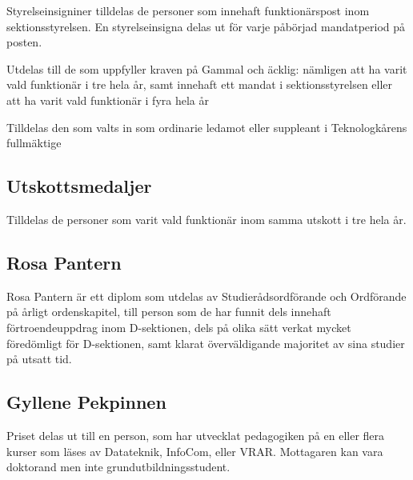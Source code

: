 \documentclass[pdfbookmarks,a4paper,11pt]{article}
\newlength{\itemcollength}
\newenvironment{reglemlista}{%
  \begin{list}{}{%
      \setlength{\labelwidth}{\itemcollength}%
      \setlength{\leftmargin}{\labelwidth + \labelsep}%
      \renewcommand{\makelabel}[1]{%
        \raisebox{0pt}[1ex][0pt]{%
          \makebox[\labelwidth][l]{%
            \parbox[t]{\itemcollength}{%
              \raggedright\hspace{0pt}##1}}}\hfill}%
      }}{%
  \end{list}}
\begin{document}
\begin{reglemlista}
	\item[Styrelseinsigniner]
	Styrelseinsigniner tilldelas de personer som innehaft funktionärspost inom sektionsstyrelsen. En styrelseinsigna delas ut för varje påbörjad mandatperiod på posten.
	\item[Gammal och äcklig]
	Utdelas till de som uppfyller kraven på Gammal och äcklig: nämligen att ha varit vald funktionär i tre hela år, samt innehaft ett mandat i sektionsstyrelsen eller att ha varit vald funktionär i fyra hela år
	\item[TLTH-Fullmäktige]
	Tilldelas den som valts in som ordinarie ledamot eller suppleant i Teknologkårens fullmäktige

\end{reglemlista}
\subsection{Utskottsmedaljer}
    
    Tilldelas de personer som varit vald funktionär inom samma utskott i tre hela år.  

\subsection{Rosa Pantern}
Rosa Pantern är ett diplom som utdelas av Studierådsordförande och Ordförande på årligt ordenskapitel, till person som de har funnit dels innehaft förtroendeuppdrag inom D-sektionen, dels på olika sätt verkat mycket föredömligt för D-sektionen, samt klarat överväldigande majoritet av sina studier på utsatt tid.

\subsection{Gyllene Pekpinnen}
Priset delas ut till en person, som har utvecklat pedagogiken på en eller flera kurser som läses av Datateknik, InfoCom, eller VRAR. Mottagaren kan vara doktorand men inte grundutbildningsstudent.
\end{document}

